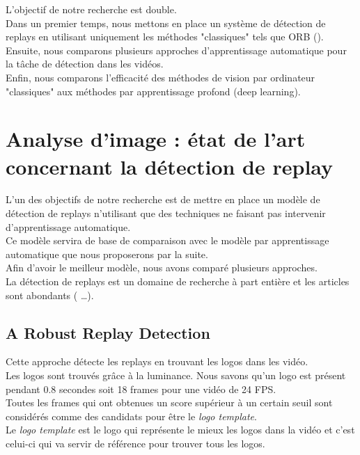 \documentclass[11pt]{article}
\begin{document}
L'objectif de notre recherche est double.\\
Dans un premier temps, nous mettons en place un système de détection de replays en utilisant uniquement les méthodes "classiques" tels que ORB (\cite{Rublee_2011}).\\
Ensuite, nous comparons plusieurs approches d'apprentissage automatique pour la tâche de détection dans les vidéos.\\
Enfin, nous comparons l'efficacité des méthodes de vision par ordinateur "classiques" aux méthodes par apprentissage profond (deep learning).\\

\newpage
\section{Analyse d'image : état de l'art concernant la détection de replay}
\label{sec:org76f7ad5}
L'un des objectifs de notre recherche est de mettre en place un modèle de détection de replays n'utilisant que des techniques ne faisant pas intervenir d'apprentissage automatique.\\
Ce modèle servira de base de comparaison avec le modèle par apprentissage automatique que nous proposerons par la suite.\\
Afin d'avoir le meilleur modèle, nous avons comparé plusieurs approches.\\

La détection de replays est un domaine de recherche à part entière et les articles sont abondants (\cite{Hao_Pan_2002,Ling_Yu_Duan,Chu_2015,Javed_2019} \ldots{}).\\

\subsection{A Robust Replay Detection}
\label{sec:orgcdae080}
Cette approche \cite{xu11_robus_replay_detec_algor_soccer_video} détecte les replays en trouvant les logos dans les vidéo.\\
Les logos sont trouvés grâce à la luminance. Nous savons qu'un logo est présent pendant 0.8 secondes soit 18 frames pour une vidéo de 24 FPS.\\
Toutes les frames qui ont obtenues un score supérieur à un certain seuil sont considérés comme des candidats pour être le \emph{logo template}.\\
Le \emph{logo template} est le logo qui représente le mieux les logos dans la vidéo et c'est celui-ci qui va servir de référence pour trouver tous les logos.\\
\end{document}

